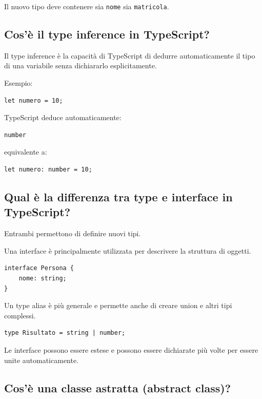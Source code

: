 \documentclass[12pt]{article}
\begin{document}
Il nuovo tipo deve contenere sia \texttt{nome} sia \texttt{matricola}.


\subsection{Cos'è il type inference in TypeScript?}

Il type inference è la capacità di TypeScript di dedurre automaticamente il tipo di una variabile senza dichiararlo esplicitamente.

Esempio:

\begin{verbatim}
let numero = 10;
\end{verbatim}

TypeScript deduce automaticamente:

\begin{verbatim}
number
\end{verbatim}

equivalente a:

\begin{verbatim}
let numero: number = 10;
\end{verbatim}


\subsection{Qual è la differenza tra type e interface in TypeScript?}

Entrambi permettono di definire nuovi tipi.

Una interface è principalmente utilizzata per descrivere la struttura di oggetti.

\begin{verbatim}
interface Persona {
    nome: string;
}
\end{verbatim}

Un type alias è più generale e permette anche di creare union e altri tipi complessi.

\begin{verbatim}
type Risultato = string | number;
\end{verbatim}

Le interface possono essere estese e possono essere dichiarate più volte per essere unite automaticamente.


\subsection{Cos'è una classe astratta (abstract class)?}
\end{document}
